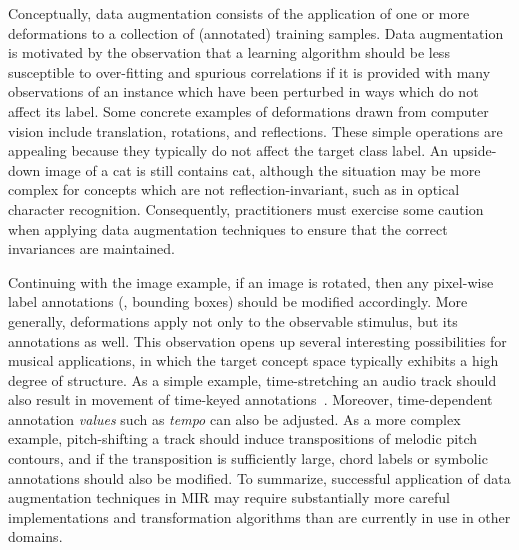 \documentclass{article}
\begin{document}
Conceptually, data augmentation consists of the application of one or more deformations to
a collection of (annotated) training samples.  
Data augmentation is motivated by the observation that a learning algorithm should be less
susceptible to over-fitting and spurious correlations if it is provided with many
observations of an instance which have been perturbed in ways which do not affect its
label.
Some concrete examples of deformations drawn from computer vision include translation, 
rotations, and reflections.  These simple operations are appealing because they typically 
do not affect the target class label. An upside-down image of a cat is still contains cat, 
although the situation may be more complex for concepts which are not reflection-invariant, 
such as in optical character recognition.  Consequently, practitioners must exercise some 
caution when applying data augmentation techniques to ensure that the correct invariances 
are maintained.

Continuing with the image example, if an image is rotated, then any pixel-wise 
label annotations (\eg, bounding boxes) should be modified accordingly.  
More generally, deformations apply not only to the observable stimulus, 
but its annotations as well.
This observation opens up several interesting possibilities for musical applications, in
which the target concept space typically exhibits a high degree of structure.
As a simple example, time-stretching an audio track should also result in movement of 
time-keyed annotations~\cite{mauch2013audio}.  
Moreover, time-dependent annotation \emph{values} such as \emph{tempo} can also be adjusted.
As a more complex example,
pitch-shifting a track should induce transpositions of melodic pitch contours,
and if the transposition is sufficiently large, chord labels or symbolic annotations
should also be modified.
To summarize, successful application of data augmentation techniques in MIR may require
substantially more careful implementations and transformation algorithms than are currently 
in use in other domains.

\end{document}
